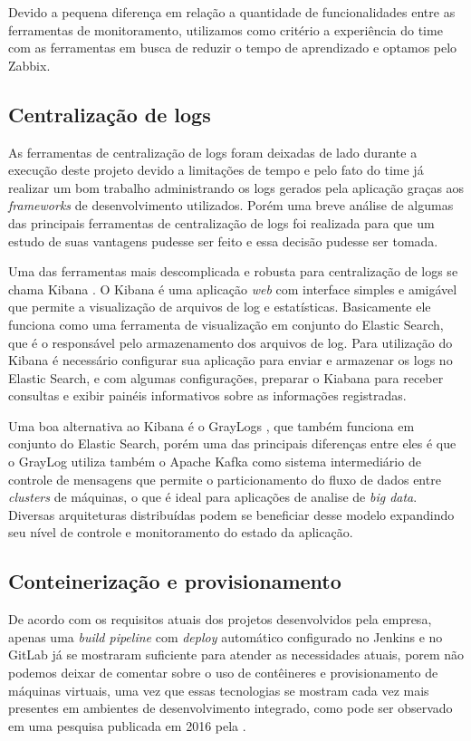 \documentclass[
	12pt,				%
	openright,			%
	twoside,			%
	a4paper,			%
	english,			%
	french,				%
	spanish,			%
	brazil,				%
	]{abntex2}
\begin{document}
Devido a pequena diferença em relação a quantidade de funcionalidades entre as ferramentas de monitoramento, utilizamos como critério a experiência do time com as ferramentas em busca de reduzir o tempo de aprendizado e optamos pelo Zabbix.

\subsection{Centralização de logs}

As ferramentas de centralização de logs foram deixadas de lado durante a execução deste projeto devido a limitações de tempo e pelo fato do time já realizar um bom trabalho administrando os logs gerados pela aplicação graças aos \textit{frameworks} de desenvolvimento utilizados. Porém uma breve análise de algumas das principais ferramentas de centralização de logs foi realizada para que um estudo de suas vantagens pudesse ser feito e essa decisão pudesse ser tomada.

Uma das ferramentas mais descomplicada e robusta para centralização de logs se chama Kibana \cite{Kibana:Logs}. O Kibana é uma aplicação \textit{web} com interface simples e amigável que permite a visualização de arquivos de log e estatísticas. Basicamente ele funciona como uma ferramenta de visualização em conjunto do Elastic Search, que é o responsável pelo armazenamento dos arquivos de log. Para utilização do Kibana é necessário configurar sua aplicação para enviar e armazenar os logs no Elastic Search, e com algumas configurações, preparar o Kiabana para receber consultas e exibir painéis informativos sobre as informações registradas.

Uma boa alternativa ao Kibana é o GrayLogs \cite{GrayLog:Logs}, que também funciona em conjunto do Elastic Search, porém uma das principais diferenças entre eles é que o GrayLog utiliza também o Apache Kafka como sistema intermediário de controle de mensagens que permite o particionamento do fluxo de dados entre \textit{clusters} de máquinas, o que é ideal para aplicações de analise de \textit{big data}. Diversas arquiteturas distribuídas podem se beneficiar desse modelo expandindo seu nível de controle e monitoramento do estado da aplicação.

\subsection{Conteinerização e provisionamento}

De acordo com os requisitos atuais dos projetos desenvolvidos pela empresa, apenas uma \textit{build pipeline} com \textit{deploy} automático configurado no Jenkins e no GitLab já se mostraram suficiente para atender as necessidades atuais, porem não podemos deixar de comentar sobre o uso de contêineres e provisionamento de máquinas virtuais, uma vez que essas tecnologias se mostram cada vez mais presentes em ambientes de desenvolvimento integrado, como pode ser observado em uma pesquisa publicada em 2016 pela .
\end{document}

